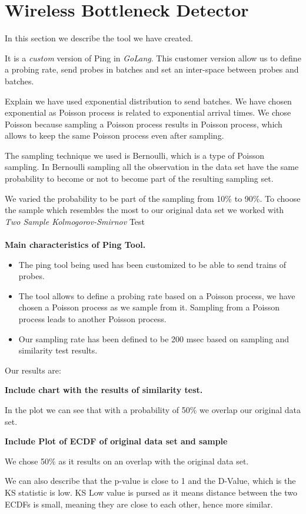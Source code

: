 \section{Wireless Bottleneck Detector}\label{Wireless Bottleneck Detector}

In this section we describe the tool we have created.

It is a \emph{custom} version of Ping in \emph{GoLang}. This customer version allow us to define a probing rate, send probes in batches and set an inter-space between probes and batches.

Explain we have used exponential distribution to send batches. We have chosen exponential as Poisson process is related to exponential arrival times. We chose Poisson because sampling a Poisson process results in Poisson process, which allows to keep the same Poisson process even after sampling.

The sampling technique we used is Bernoulli, which is a type of Poisson sampling. In Bernoulli sampling all the observation in the data set have the same probability to become or not to become part of the resulting sampling set.

We varied the probability to be part of the sampling from 10\% to 90\%. To choose the sample which resembles the most to our original data set we worked with \emph{Two Sample Kolmogorov-Smirnov} Test
\\
\\
\textbf{Main characteristics of Ping Tool.}
\begin{itemize}
	\item The ping tool being used has been customized to be able to send trains of probes.
	\item The tool allows to define a probing rate based on a Poisson process, we have chosen a Poisson process as we sample from it. Sampling from a Poisson process leads to another Poisson process.
	\item Our sampling rate has been defined to be 200 msec based on sampling and similarity test results.
\end{itemize}




Our results are:

\textbf{Include chart with the results of similarity test.}

In the plot we can see that with a probability of 50\% we overlap our original data set.

\textbf{Include Plot of ECDF of original data set and sample}

We chose 50\% as it results on an overlap with the original data set.

We can also describe that the p-value is close to 1 and the D-Value, which is the KS statistic is low. KS Low value is pursed as it means distance between the two ECDFs is small, meaning they are close to each other, hence more similar.